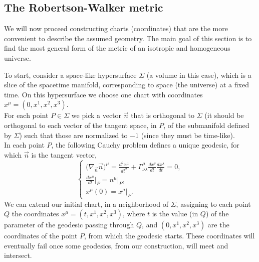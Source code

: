 \subsection{The Robertson-Walker metric}
We will now proceed constructing charts (coordinates) that are the more convenient to describe the assumed geometry. The main goal of this section is to find the most general form of the metric of an isotropic and homogeneous universe.

To start, consider a space-like hypersurface $\Sigma$ (a volume in this case), which is a slice of the spacetime manifold, corresponding to space (the universe) at a fixed time. On this hypersurface we choose one chart with coordinates $x^\mu=(0,x^1,x^2,x^3)$.\\ For each point $P\in\Sigma$ we pick a vector $\vec n$ that is orthogonal to $\Sigma$ (it should be orthogonal to each vector of the tangent space, in $P$, of the submanifold defined by $\Sigma$) such that those are normalized to $-1$ (since they must be time-like).\\ In each point $P$, the following Cauchy problem defines a unique geodesic, for which $\vec n$ is the tangent vector,
\begin{equation}\label{Chaucy problem}
    \begin{cases}
        \big(\nabla_{\vec n}\vec n\big)^\mu=\frac{d^2x^\mu}{dt^2}+\Gamma_{\nu\lambda}^{\mu}\frac{dx^\nu}{dt}\frac{dx^\lambda}{dt}=0,\\\frac{dx^\mu}{dt}\big|_{P}=n^\mu\big|_P,\\x^\mu(0)=x^\mu\big|_P.
    \end{cases}
\end{equation}
We can extend our initial chart, in a neighborhood of $\Sigma$, assigning to each point $Q$ the coordinates $x^\mu=(t,x^1,x^2,x^3)$, where $t$ is the value (in $Q$) of the parameter of the geodesic passing through $Q$, and $(0,x^1,x^2,x^3)$ are the coordinates of the point $P$, from which the geodesic starts. These coordinates will eventually fail once some geodesics, from our construction, will meet and intersect.

